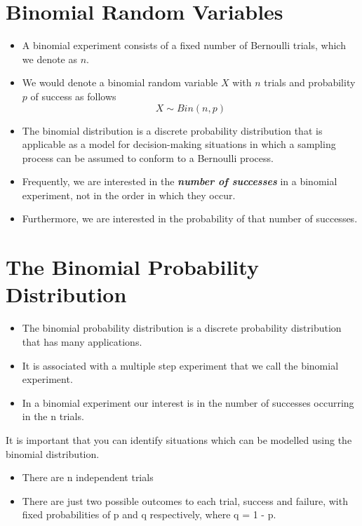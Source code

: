 \documentclass[a4paper,12pt]{article}
\begin{document}
\section*{Binomial Random Variables}
\begin{itemize}
\item A binomial experiment consists of a fixed number of Bernoulli trials, which we denote as $n$. 



\item We would denote a binomial random variable $X$ with $n$ trials and
probability $p$ of success as follows
\[X \sim Bin(n, p)\]
\item The binomial distribution  is a discrete probability distribution that is applicable as a model for decision-making
situations in which a sampling process can be assumed to conform to a Bernoulli process. 
	\item Frequently, we are interested in the \textbf{\emph{number of successes}} in a binomial experiment, not in the order in which they occur.
	\item Furthermore, we are interested in the probability of that number of successes.
\end{itemize}

\newpage


\section*{The Binomial Probability Distribution}

\begin{itemize}
	\item The binomial probability distribution is a discrete probability distribution that has many applications.
	\item It is associated with a multiple step experiment that we call the binomial experiment.
	\item In a binomial experiment our interest is in the number of successes occurring in the n trials.
\end{itemize}

\medskip

\noindent It is important that you can identify situations which can be modelled using the binomial distribution. 
\begin{itemize}
	\item There are n independent trials 
	\item There are just two possible outcomes to each trial, success and failure, with fixed probabilities of p and q respectively, where q = 1 - p. 
\end{itemize}
\end{document}
